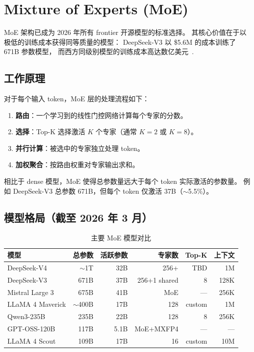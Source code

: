 \documentclass[
  customlatinfont = macos,
]{hkustthesis}
\begin{document}
\frontmatter
\tableofcontents

\mainmatter

\chapter{Mixture of Experts (MoE)}
\label{ch:moe}

MoE 架构已成为 2026 年所有 frontier 开源模型的标准选择。
其核心价值在于以极低的训练成本获得同等质量的模型：
DeepSeek-V3 以 \$5.6M 的成本训练了 671B 参数模型，
而西方同级别模型的训练成本高达数亿美元~\cite{deepseekv3}.

\section{工作原理}

对于每个输入 token，MoE 层的处理流程如下：
\begin{enumerate}[noitemsep]
  \item \textbf{路由}：一个学习到的线性门控网络计算每个专家的分数。
  \item \textbf{选择}：Top-K 选择激活 $K$ 个专家（通常 $K=2$ 或 $K=8$）。
  \item \textbf{并行计算}：被选中的专家独立处理 token。
  \item \textbf{加权聚合}：按路由权重对专家输出求和。
\end{enumerate}

相比于 dense 模型，MoE 使得总参数量远大于每个 token 实际激活的参数量。
例如 DeepSeek-V3 总参数 671B，但每个 token 仅激活 37B（$\sim$5.5\%）。

\section{模型格局（截至 2026 年 3 月）}

\begin{table}[H]
\centering\small
\caption{主要 MoE 模型对比}
\label{tab:moe-models}
\begin{tabularx}{\linewidth}{l r r r r r}
\toprule
\textbf{模型} & \textbf{总参数} & \textbf{活跃参数} & \textbf{专家数} & \textbf{Top-K} & \textbf{上下文} \\
\midrule
DeepSeek-V4       & $\sim$1T & 32B & 256+ & TBD & 1M \\
DeepSeek-V3       & 671B & 37B & 256+1 shared & 8 & 128K \\
Mistral Large 3   & 675B & 41B & MoE & --- & 256K \\
LLaMA 4 Maverick  & $\sim$400B & 17B & 128 & custom & 1M \\
Qwen3-235B        & 235B & 22B & 128 & 8 & 256K \\
GPT-OSS-120B      & 117B & 5.1B & MoE+MXFP4 & --- & --- \\
LLaMA 4 Scout     & 109B & 17B & 16 & custom & 10M \\
\bottomrule
\end{tabularx}
\end{table}
\end{document}
